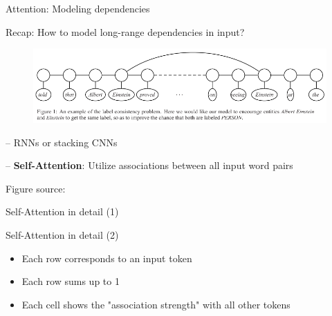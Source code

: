 \documentclass[12pt]{beamer}
\begin{document}
\begin{frame}{Attention: Modeling dependencies}
	
Recap: How to model long-range dependencies in input?

\begin{figure}
	\includegraphics[width=0.95\linewidth]{img/long-deps.png}
\end{figure}


-- RNNs or stacking CNNs

-- \textbf{Self-Attention}: Utilize associations between all input word pairs

\begin{scriptsize}
Figure source: 
\end{scriptsize}

\end{frame}



\begin{frame}{Self-Attention in detail (1)}

	
\begin{figure}
\scalebox{0.75}{\hspace{-2cm}
	
}
\end{figure}
	
\end{frame}

\begin{frame}{Self-Attention in detail (2)}
	
	
	\begin{figure}
		\scalebox{0.75}{\hspace{-2cm}
			
		}
	\end{figure}
	
	\begin{itemize}
		\item 	Each row corresponds to an input token
		
		\item Each row sums up to 1
		
		\item Each cell shows the "association strength" with all other tokens
		
	\end{itemize}
	
	
\end{frame}
\end{document}

